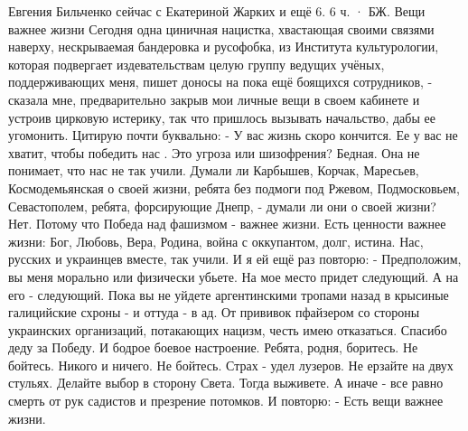 \documentclass[a4paper,11pt]{extreport}
\begin{document}
Евгения Бильченко сейчас с Екатериной Жарких и ещё 6.
6 ч. ·
БЖ. Вещи важнее жизни
Сегодня одна циничная нацистка, хвастающая своими связями наверху, нескрываемая бандеровка и русофобка, из Института культурологии, которая подвергает издевательствам целую группу ведущих учёных, поддерживающих меня, пишет доносы на пока ещё боящихся сотрудников, - сказала мне, предварительно закрыв мои личные вещи в своем кабинете и устроив цирковую истерику, так что пришлось вызывать начальство, дабы ее угомонить.
Цитирую почти буквально:
- У вас жизнь скоро кончится. Ее у вас не хватит, чтобы победить нас .
Это угроза или шизофрения? Бедная. Она не понимает, что нас не так учили. Думали ли Карбышев, Корчак, Маресьев, Космодемьянская о своей жизни, ребята без подмоги под Ржевом, Подмосковьем, Севастополем, ребята, форсирующие Днепр, - думали ли они о своей жизни?
Нет. Потому что Победа над фашизмом - важнее жизни. Есть ценности важнее жизни: Бог, Любовь, Вера, Родина, война с оккупантом, долг, истина.
Нас, русских и украинцев вместе, так учили.
И я ей ещё раз повторю:
- Предположим, вы меня морально или физически убьете. На мое место придет следующий. А на его - следующий. Пока вы не уйдете аргентинскими тропами назад в крысиные галицийские схроны - и оттуда - в ад.
От прививок пфайзером со стороны украинских организаций, потакающих нацизм, честь имею отказаться.
Спасибо деду за Победу. И бодрое боевое настроение. Ребята, родня, боритесь. Не бойтесь. Никого и ничего. Не бойтесь. Страх - удел лузеров. Не ерзайте на двух стульях. Делайте выбор в сторону Света. Тогда выживете. А иначе - все равно смерть от рук садистов и презрение потомков.
И повторю:
- Есть вещи важнее жизни.
\end{document}
